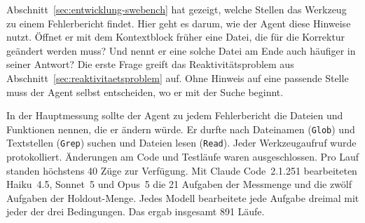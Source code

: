 \begin{ungelesen}
{\color{red}
Abschnitt~\ref{sec:entwicklung-swebench} hat gezeigt, welche Stellen das Werkzeug zu einem Fehlerbericht findet. Hier geht es darum, wie der Agent diese Hinweise nutzt. Öffnet er mit dem Kontextblock früher eine Datei, die für die Korrektur geändert werden muss? Und nennt er eine solche Datei am Ende auch häufiger in seiner Antwort? Die erste Frage greift das Reaktivitätsproblem aus Abschnitt~\ref{sec:reaktivitaetsproblem} auf. Ohne Hinweis auf eine passende Stelle muss der Agent selbst entscheiden, wo er mit der Suche beginnt.

In der Hauptmessung sollte der Agent zu jedem Fehlerbericht die Dateien und Funktionen nennen, die er ändern würde. Er durfte nach Dateinamen (\texttt{Glob}) und Textstellen (\texttt{Grep}) suchen und Dateien lesen (\texttt{Read}). Jeder Werkzeugaufruf wurde protokolliert. Änderungen am Code und Testläufe waren ausgeschlossen. Pro Lauf standen höchstens 40 Züge zur Verfügung. Mit Claude Code~2.1.251 bearbeiteten Haiku~4.5, Sonnet~5 und Opus~5 die 21 Aufgaben der Messmenge und die zwölf Aufgaben der Holdout-Menge. Jedes Modell bearbeitete jede Aufgabe dreimal mit jeder der drei Bedingungen. Das ergab insgesamt 891 Läufe.

}
\end{ungelesen}

